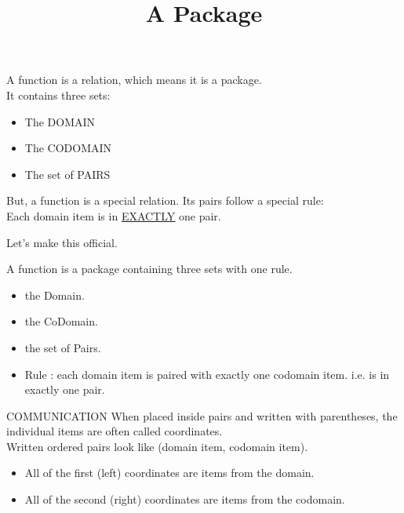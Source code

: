 \documentclass{ximera}
\title{A Package}
\begin{document}
\begin{abstract}
\end{abstract}

\maketitle





\begin{sectionOutcomes}

A function is a relation, which means it is a package.\\
It contains three sets:
\begin{itemize}
\item The DOMAIN
\item The CODOMAIN
\item The set of PAIRS
\end{itemize}
\end{sectionOutcomes}


But, a function is a special relation.  Its pairs follow a special rule: \\
Each domain item is in \underline{EXACTLY} one pair.

Let's make this official.


\begin{definition}  
A function is a package containing three sets with one rule.
\begin{itemize}
\item the Domain. 
\item the CoDomain. 
\item the set of Pairs.
\item Rule : each domain item is paired with exactly one codomain item.  i.e. is in exactly one pair.
\end{itemize}
\end{definition}



\begin{remark} COMMUNICATION
When placed inside pairs and written with parentheses, the individual items are often called coordinates. \\
Written ordered pairs look like (domain item, codomain item).
\begin{itemize}
\item All of the first (left) coordinates are items from the domain.
\item All of the second (right) coordinates are items from the codomain.
\end{itemize}
\end{remark}
\end{document}
